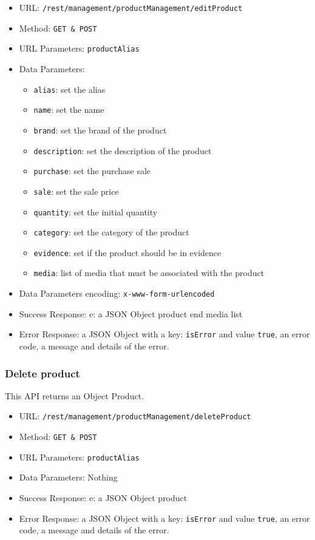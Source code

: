 \begin{itemize}
    \item URL: \texttt{/rest/management/productManagement/editProduct}
    \item Method: \texttt{{GET \& POST}}
    \item URL Parameters: \texttt{productAlias}
    \item Data Parameters: 
    \begin{itemize}
        \item \texttt{alias}: set the alias
        \item \texttt{name}: set the name
        \item \texttt{brand}: set the brand of the product
        \item \texttt{description}: set the description of the product
        \item \texttt{purchase}: set the purchase sale
        \item \texttt{sale}: set the sale price
        \item \texttt{quantity}: set the initial quantity
        \item \texttt{category}: set the category of the product
        \item \texttt{evidence}: set if the product should be in evidence
        \item \texttt{media}: list of media that must be associated with the product
    \end{itemize}
    \item Data Parameters encoding: \texttt{x-www-form-urlencoded}
    \item Success Response: e: a JSON Object product end media list
    \item Error Response: a JSON Object with a key: \texttt{isError}  and value \texttt{true}, an error code, a message and details of the error.
\end{itemize}



\subsubsection*{Delete product}
This API returns an Object Product.

\begin{itemize}
    \item URL: \texttt{/rest/management/productManagement/deleteProduct}
    \item Method: \texttt{{GET \& POST}}
    \item URL Parameters: \texttt{productAlias}
    \item Data Parameters: Nothing
    \item Success Response: e: a JSON Object product
    \item Error Response: a JSON Object with a key: \texttt{isError}  and value \texttt{true}, an error code, a message and details of the error.
\end{itemize}


